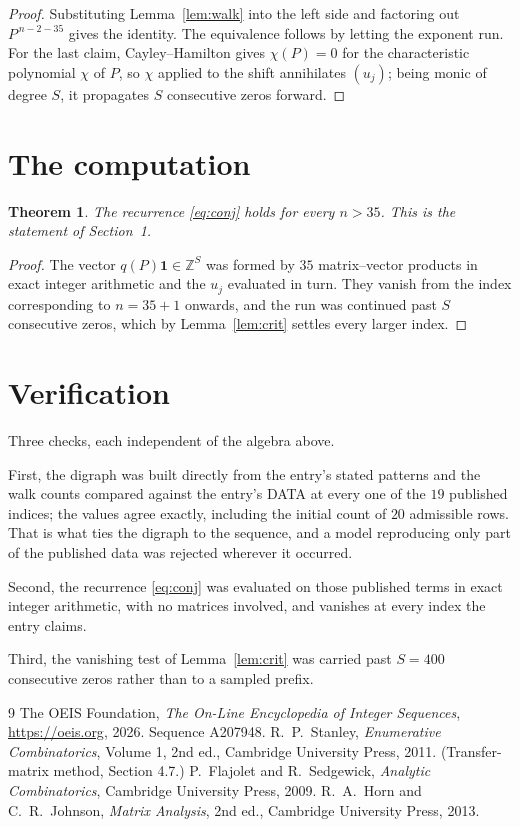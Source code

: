 \documentclass[11pt,a4paper]{article}
\theoremstyle{plain}
\newtheorem{theorem}{Theorem}
\theoremstyle{definition}
\begin{document}
\begin{proof}
Substituting Lemma~\ref{lem:walk} into the left side and factoring out
$P^{\,n-2-35}$ gives the identity. The equivalence follows by letting the exponent
run. For the last claim, Cayley--Hamilton gives $\chi(P)=0$ for the characteristic
polynomial $\chi$ of $P$, so $\chi$ applied to the shift annihilates $(u_j)$; being monic of
degree $S$, it propagates $S$ consecutive zeros forward.
\end{proof}

\section{The computation}

\begin{theorem}
The recurrence \eqref{eq:conj} holds for every $n>35$. This is the statement of
Section~1.
\end{theorem}

\begin{proof}
The vector $q(P)\mathbf{1}\in\mathbb{Z}^{S}$ was formed by $35$ matrix--vector
products in exact integer arithmetic and the $u_j$ evaluated in turn. They vanish from the
index corresponding to $n=35+1$ onwards, and the run was continued past $S$ consecutive
zeros, which by Lemma~\ref{lem:crit} settles every larger index.
\end{proof}

\section{Verification}

Three checks, each independent of the algebra above.

First, the digraph was built directly from the entry's stated patterns and the walk counts
compared against the entry's DATA at every one of the $19$ published indices; the
values agree exactly, including the initial count of $20$ admissible rows. That is
what ties the digraph to the sequence, and a model reproducing only part of the published
data was rejected wherever it occurred.

Second, the recurrence \eqref{eq:conj} was evaluated on those published terms in exact
integer arithmetic, with no matrices involved, and vanishes at every index the entry claims.

Third, the vanishing test of Lemma~\ref{lem:crit} was carried past $S=400$ consecutive
zeros rather than to a sampled prefix.

\begin{thebibliography}{9}
 The OEIS Foundation, \emph{The On-Line Encyclopedia of Integer
Sequences}, \url{https://oeis.org}, 2026. Sequence A207948.
 R.~P.~Stanley, \emph{Enumerative Combinatorics}, Volume 1, 2nd ed.,
Cambridge University Press, 2011. (Transfer-matrix method, Section 4.7.)
 P.~Flajolet and R.~Sedgewick, \emph{Analytic Combinatorics}, Cambridge
University Press, 2009.
 R.~A.~Horn and C.~R.~Johnson, \emph{Matrix Analysis}, 2nd ed., Cambridge
University Press, 2013.
\end{thebibliography}
\end{document}
